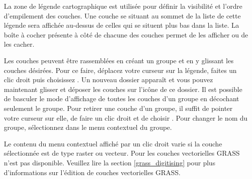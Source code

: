 La zone de légende cartographique est utilisée pour définir la visibilité et l'ordre d'empilement des couches. Une couche se situant au sommet de la liste de cette légende sera affichée au-dessus de celles qui se situent plus bas dans la liste. La boîte à cocher présente à côté de chacune des couches permet de les afficher ou de les cacher.

Les couches peuvent être rassemblées en créant un groupe et en y glissant les couches désirées. Pour ce faire, déplacez votre curseur sur la légende, faites un clic droit puis choisissez . Un nouveau dossier apparaît et vous pouvez maintenant glisser et déposer les couches sur l'icône de ce dossier. Il est possible de basculer le mode d'affichage de toutes les couches d'un groupe en décochant seulement le groupe. Pour retirer une couche d'un groupe, il suffit de pointer votre curseur sur elle, de faire un clic droit et de choisir . Pour changer le nom du groupe, sélectionnez  dans le menu contextuel du groupe.

Le contenu du menu contextuel affiché par un clic droit varie si la couche sélectionnée est de type raster ou  vecteur. Pour les couches vectorielles GRASS  n'est pas disponible. Veuillez lire la section \ref{grass_digitising} pour plus d'informations sur l'édition de couches vectorielles GRASS.


